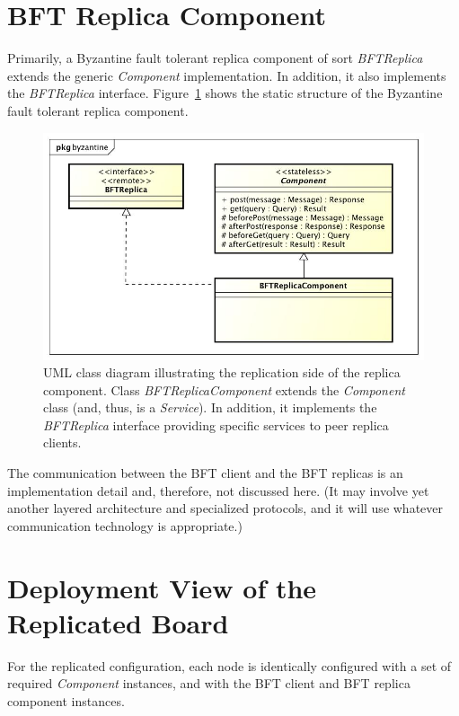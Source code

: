 \documentclass[oneside]{scrreprt}
\newcommand{\fig}[1]{Figure~\ref{#1}}
\begin{document}
\section{BFT Replica Component}

Primarily, a Byzantine fault tolerant replica
component of sort \emph{BFTReplica} extends the
generic \emph{Component} implementation. In addition,
it also implements the \emph{BFTReplica} interface.
\fig{fig:byzantine-replica} shows
the static structure of the Byzantine fault tolerant replica
component.


\begin{figure}[ht<]
\centerline{
\includegraphics[width=1.0\textwidth]{figs/byzantine-replica}}
\caption{UML class diagram illustrating the replication side
of the replica component. Class \emph{BFTReplicaComponent}
extends the \emph{Component} class (and, thus, is a \emph{Service}). In
addition, it implements the \emph{BFTReplica} interface providing
specific services to peer replica clients.}
\label{fig:byzantine-replica}
\end{figure}

The communication between the BFT client and the BFT replicas
is an implementation detail and, therefore, not discussed here.
(It may involve yet another layered architecture and specialized
protocols, and it will use whatever communication technology
is appropriate.)


\section{Deployment View of the Replicated Board}

For the replicated configuration, each node is identically
configured with a set of required \emph{Component} instances, and
with the BFT client and BFT replica component instances.
\end{document}
